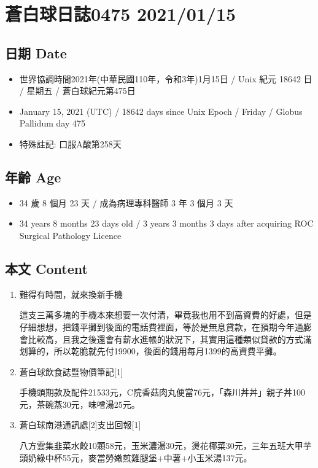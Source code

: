 \documentclass[a5paper, 11pt
]{book}
\providecommand{\tightlist}{%
  \setlength{\itemsep}{0pt}\setlength{\parskip}{0pt}}
\begin{document}
\hypertarget{ux84bcux767dux7403ux65e5ux8a8c0475-20210115}{%
\section{蒼白球日誌0475
2021/01/15}\label{ux84bcux767dux7403ux65e5ux8a8c0475-20210115}}

\hypertarget{ux65e5ux671f-date-45}{%
\subsection{日期 Date}\label{ux65e5ux671f-date-45}}

\begin{itemize}
\tightlist
\item
  世界協調時間2021年(中華民國110年，令和3年)1月15日 / Unix 紀元 18642 日
  / 星期五 / 蒼白球紀元第475日
\item
  January 15, 2021 (UTC) / 18642 days since Unix Epoch / Friday / Globus
  Pallidum day 475
\item
  特殊註記: 口服A酸第258天
\end{itemize}

\hypertarget{ux5e74ux9f61-age-45}{%
\subsection{年齡 Age}\label{ux5e74ux9f61-age-45}}

\begin{itemize}
\tightlist
\item
  34 歲 8 個月 23 天 / 成為病理專科醫師 3 年 3 個月 3 天
\item
  34 years 8 months 23 days old / 3 years 3 months 3 days after
  acquiring ROC Surgical Pathology Licence
\end{itemize}

\hypertarget{ux672cux6587-content-45}{%
\subsection{本文 Content}\label{ux672cux6587-content-45}}

\begin{enumerate}
\def\labelenumi{\arabic{enumi}.}
\item
  難得有時間，就來換新手機

  這支三萬多塊的手機本來想要一次付清，畢竟我也用不到高資費的好處，但是仔細想想，把錢平攤到後面的電話費裡面，等於是無息貸款，在預期今年通膨會比較高，且我之後還會有薪水進帳的狀況下，其實用這種類似貸款的方式滿划算的，所以乾脆就先付19900，後面的錢用每月1399的高資費平攤。
\item
  蒼白球飲食誌暨物價筆記{[}1{]}

  手機頭期款及配件21533元，C院香菇肉丸便當76元，「森川丼丼」親子丼100元，茶碗蒸30元，味噌湯25元。
\item
  蒼白球南港通訊處{[}2{]}支出回報{[}1{]}

  八方雲集韭菜水餃10顆58元，玉米濃湯30元，燙花椰菜30元，三年五班大甲芋頭奶綠中杯55元，麥當勞嫩煎雞腿堡+中薯+小玉米湯137元。
\end{enumerate}
\end{document}

